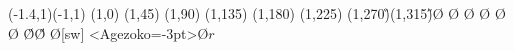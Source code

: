 \begin{zahyou*}[ul=3.5zw](-1.4,1)(-1,1)%
\kyokuTyoku(1,0)\A%
\kyokuTyoku(1,45)\B%
\kyokuTyoku(1,90)\C%
\kyokuTyoku(1,135)\D%
\kyokuTyoku(1,180)\E%
\kyokuTyoku(1,225)\F%
\kyokuTyoku(1,270)\G%
\kyokuTyoku(1,315)\H%
\ArrowLine\O\A
\ArrowLine\O\B
\ArrowLine\O\C
\ArrowLine\O\D
\ArrowLine\O\E
\ArrowLine\O\F
\ArrowLine\O\G
\ArrowLine\O\H
{}
\Put\O[sw]{\scalebox{.7}{Q}}
\kuromaru{\O}
\HenKo[0]<Agezoko=-3pt>\Z\O{$r$}
\Put{}
\end{zahyou*}
